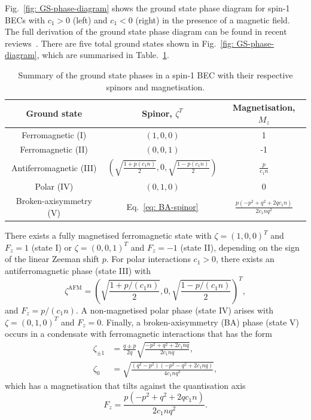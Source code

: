 Fig.~\ref{fig: GS-phase-diagram} shows the ground state phase diagram for spin-1
BECs with \(c_1 > 0\) (left) and \(c_1 < 0\) (right) in the presence of a
magnetic field.
The full derivation of the ground state phase diagram can be found in recent
reviews~\cite{Kawaguchi2012, StamperKurn2013}.
There are five total ground states shown in Fig.~\ref{fig: GS-phase-diagram},
which are summarised in Table.~\ref{tab: spin-1-ground-states}.
\begin{table}
    \centering
    \begin{tabular}{ccc}
        \toprule
        Ground state & Spinor, \(\zeta^T\) & Magnetisation, \(M_z\) \\
        \midrule
        Ferromagnetic (I) & \((1, 0, 0)\) & 1\\
        Ferromagnetic (II) & \((0, 0, 1)\) & -1\\
        Antiferromagnetic (III) & \(\left(\sqrt{\frac{1 + p(c_1n)}{2}}, 0,
        \sqrt{\frac{1 - p(c_1n)}{2}}\right)\) & \(\frac{p}{c_1n}\) \\
        Polar (IV) & \((0, 1, 0)\) & 0 \\
        Broken-axisymmetry (V) & Eq.~\eqref{eq: BA-spinor}
        & \(\frac{p(-p^2+q^2+2qc_1n)}{2c_1nq^2}\) \\
        \bottomrule
    \end{tabular}
    \caption{\label{tab: spin-1-ground-states}Summary of the ground state
    phases in a spin-1 BEC with their respective spinors and magnetisation.}
\end{table}
There exists a fully magnetised ferromagnetic state with \(\zeta={(1, 0, 0)}^T\)
and \(F_z=1\) (state I) or \(\zeta={(0, 0, 1)}^T\) and \(F_z=-1\) (state II),
depending on the sign of the linear Zeeman shift \(p\).
For polar interactions \(c_1 > 0\), there exists an antiferromagnetic phase
(state III) with
\begin{equation}
    \zeta^\mathrm{AFM} = {\left(\sqrt{\frac{1 + p/(c_1n)}{2}}, 0,
    \sqrt{\frac{1 - p/(c_1n)}{2}}\right)}^T,
\end{equation}
and \(F_z = p/(c_1n)\).
A non-magnetised polar phase (state IV) arises with \(\zeta={(0, 1, 0)}^T\) and
\(F_z = 0\).
Finally, a broken-axisymmetry (BA) phase (state V) occurs in a condensate with
ferromagnetic interactions that has the form
\begin{equation}
    \begin{aligned}
        \zeta_{\pm 1} &= 
                    \frac{q \pm p}{2q}\sqrt{\frac{-p^2+q^2+2c_1nq}{2c_1nq}}, \\
        \zeta_0 &= \sqrt{\frac{(q^2-p^2)(-p^2-q^2+2c_1nq)}{4c_1nq^3}},
    \end{aligned}
    \label{eq: BA-spinor}
\end{equation}
which has a magnetisation that tilts against the quantisation axis
\begin{equation}
    F_z = \frac{p(-p^2 + q^2 + 2qc_1n)}{2c_1nq^2}.
\end{equation}

